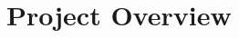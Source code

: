 \documentclass[
	letterpaper, %
	12pt, %
]{1_resources/projectUpdate}
\begin{document}

\frontmatter


\mainmatter

\def\partName{Underground Division}
\section{Project Overview}


\end{document}
